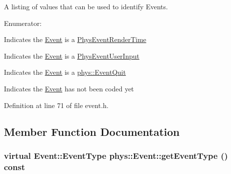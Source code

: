 A listing of values that can be used to identify Events. \begin{Desc}
\item[Enumerator: ]\par
\begin{description}
\item[{\em 
\hypertarget{classphys_1_1Event_af5fdbb3e08d8e578d58770fbc606fda7a72c30ea5e5c4f5cb55382ad0d1317aa8}{
RenderTime}
\label{d5/dcb/classphys_1_1Event_af5fdbb3e08d8e578d58770fbc606fda7a72c30ea5e5c4f5cb55382ad0d1317aa8}
}]Indicates the \hyperlink{classphys_1_1Event}{Event} is a \hyperlink{classPhysEventRenderTime}{PhysEventRenderTime} \item[{\em 
\hypertarget{classphys_1_1Event_af5fdbb3e08d8e578d58770fbc606fda7a91c3cf8e29385c1e10925d3bd4778cfc}{
UserInput}
\label{d5/dcb/classphys_1_1Event_af5fdbb3e08d8e578d58770fbc606fda7a91c3cf8e29385c1e10925d3bd4778cfc}
}]Indicates the \hyperlink{classphys_1_1Event}{Event} is a \hyperlink{classPhysEventUserInput}{PhysEventUserInput} \item[{\em 
\hypertarget{classphys_1_1Event_af5fdbb3e08d8e578d58770fbc606fda7a085b70182742e0cc874f04f8aa615ff0}{
QuitMessage}
\label{d5/dcb/classphys_1_1Event_af5fdbb3e08d8e578d58770fbc606fda7a085b70182742e0cc874f04f8aa615ff0}
}]Indicates the \hyperlink{classphys_1_1Event}{Event} is a \hyperlink{classphys_1_1EventQuit}{phys::EventQuit} \item[{\em 
\hypertarget{classphys_1_1Event_af5fdbb3e08d8e578d58770fbc606fda7a7558324b74ee7b6ec1e69d7ab1a13749}{
SystemMessage}
\label{d5/dcb/classphys_1_1Event_af5fdbb3e08d8e578d58770fbc606fda7a7558324b74ee7b6ec1e69d7ab1a13749}
}]Indicates the \hyperlink{classphys_1_1Event}{Event} has not been coded yet \end{description}
\end{Desc}



Definition at line 71 of file event.h.

\subsection{Member Function Documentation}
\hypertarget{classphys_1_1Event_ac2c0623a6bc399e62f4b9fb2c022ea73}{
\subsubsection[{getEventType}]{\setlength{\rightskip}{0pt plus 5cm}virtual {\bf Event::EventType} phys::Event::getEventType () const}}
\label{d5/dcb/classphys_1_1Event_ac2c0623a6bc399e62f4b9fb2c022ea73}



